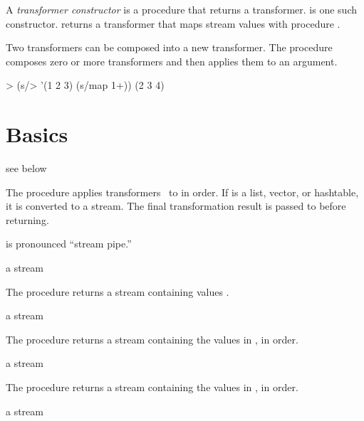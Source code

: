 A \emph{transformer constructor} is a procedure that returns a transformer. 
is one such constructor.  returns a transformer that maps stream values
with procedure .

Two transformers can be composed into a new transformer. The  procedure composes
zero or more transformers and then applies them to an argument.

\codebegin
> (s/> '(1 2 3) (s/map 1+))
(2 3 4)
\codeend

\section {Basics}

\begin{procedure}
\end{procedure}
\returns{} see below

The  procedure applies transformers  \etc\ to  in order. If
 is a list, vector, or hashtable, it is converted to a stream. The final
transformation result is passed to  before returning.

 is pronounced ``stream pipe.''

\begin{procedure}
\end{procedure}
\returns{} a stream

The  procedure returns a stream containing values  \etc.

\begin{procedure}
\end{procedure}
\returns{} a stream

The  procedure returns a stream containing the values in , in
order.

\begin{procedure}
\end{procedure}
\returns{} a stream

The  procedure returns a stream containing the values in
, in order.

\begin{procedure}
\end{procedure}
\returns{} a stream

